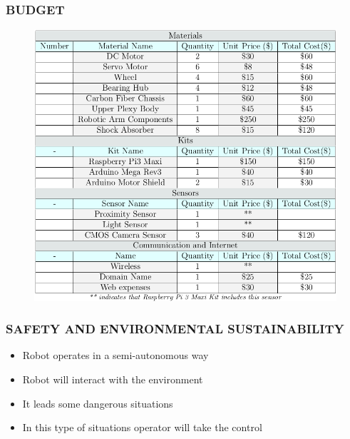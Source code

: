 \documentclass{beamer}
\begin{document}
 \begin{frame}
  \frametitle{BUDGET}
  \begin{figure}[h!]
   \begin{center}
    \includegraphics[scale=0.3]{budget}
   \end{center}
  \end{figure}
 \end{frame}
 
 \begin{frame}
  \frametitle{SAFETY AND ENVIRONMENTAL SUSTAINABILITY}
  \begin{itemize}
   \item Robot operates in a semi-autonomous way
   \item Robot will interact with the environment
   \item It leads some dangerous situations
   \item In this type of situations operator will take the control
  \end{itemize}
 \end{frame}
\end{document}
